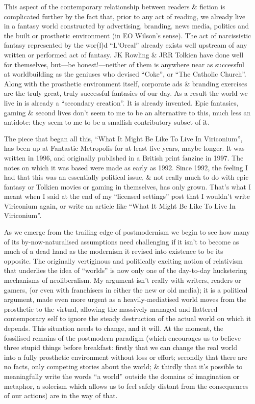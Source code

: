 \documentclass[14pt]{extarticle}
\begin{document}
This aspect of the contemporary relationship between readers \& fiction is complicated further by the fact that, prior to any act of reading, we already live in a fantasy world constructed by advertising, branding, news media, politics and the built or prosthetic environment (in EO Wilson’s sense). The act of narcissistic fantasy represented by the wor(l)d “L’Oreal” already exists well upstream of any written or performed act of fantasy. JK Rowling \& JRR Tolkien have done well for themselves, but—be honest!—neither of them is anywhere near as successful at worldbuilding as the geniuses who devised “Coke”, or “The Catholic Church”. Along with the prosthetic environment itself, corporate ads \& branding exercises are the truly great, truly successful fantasies of our day. As a result the world we live in is already a “secondary creation”. It is already invented. Epic fantasies, gaming \& second lives don’t seem to me to be an alternative to this, much less an antidote: they seem to me to be a smallish contributory subset of it.

The piece that began all this, “What It Might Be Like To Live In Viriconium”, has been up at Fantastic Metropolis for at least five years, maybe longer. It was written in 1996, and originally published in a British print fanzine in 1997. The notes on which it was based were made as early as 1992. Since 1992, the feeling I had that this was an essentially political issue, \& not really much to do with epic fantasy or Tolkien movies or gaming in themselves, has only grown. That’s what I meant when I said at the end of my “licensed settings” post that I wouldn’t write Viriconium again, or write an article like “What It Might Be Like To Live In Viriconium”.

As we emerge from the trailing edge of postmodernism we begin to see how many of its by-now-naturalised assumptions need challenging if it isn’t to become as much of a dead hand as the modernism it revised into existence to be its opposite. The originally vertiginous and politically exciting notion of relativism that underlies the idea of “worlds” is now only one of the day-to-day huckstering mechanisms of neoliberalism. My argument isn’t really with writers, readers or gamers, (or even with franchisers in either the new or old media); it is a political argument, made even more urgent as a heavily-mediatised world moves from the prosthetic to the virtual, allowing the massively managed and flattered contemporary self to ignore the steady destruction of the actual world on which it depends. This situation needs to change, and it will. At the moment, the fossilised remains of the postmodern paradigm (which encourages us to believe three stupid things before breakfast: firstly that we can change the real world into a fully prosthetic environment without loss or effort; secondly that there are no facts, only competing stories about the world; \& thirdly that it’s possible to meaningfully write the words “a world” outside the domains of imagination or metaphor, a solecism which allows us to feel safely distant from the consequences of our actions) are in the way of that.
\end{document}
